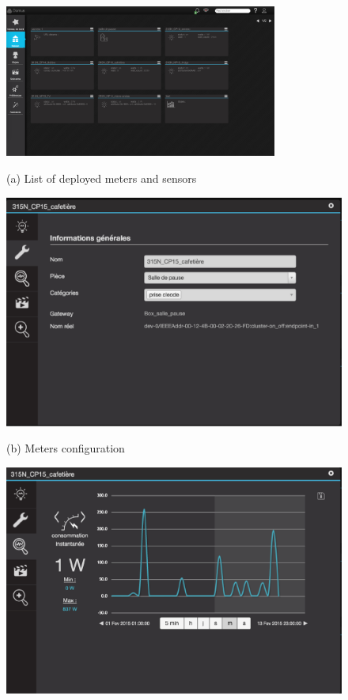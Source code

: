 \begin{figure}[htb]
\begin{minipage}[h]{1\linewidth}
\centering
\includegraphics[width=0.8\textwidth]{./chapters/chapter3/images/A_web1.pdf}
\centerline{(a) List of deployed meters and sensors}\medskip
\end{minipage}
\hfill
\begin{minipage}[h]{0.48\linewidth}
\centering
\includegraphics[width=1\textwidth]{./chapters/chapter3/images/A_web2.pdf}
\centerline{(b) Meters configuration}\medskip
\end{minipage}
\hfill
\begin{minipage}[h]{0.48\linewidth}
\centering
\includegraphics[width=1\textwidth]{./chapters/chapter3/images/A_web3.pdf}

\end{minipage}
\end{figure}
